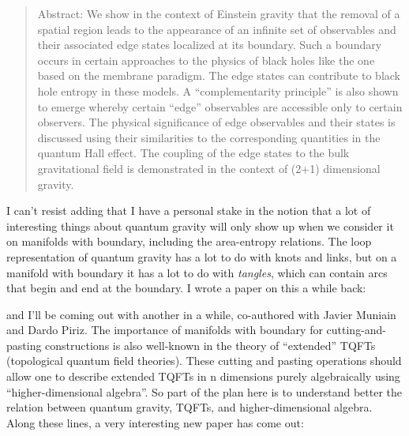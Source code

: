 \documentclass{article}
\def\tightlist{}
\renewcommand{\texttt}[1]{%
  \begingroup
  \ttfamily
  \begingroup\lccode`~=`/\lowercase{\endgroup\def~}{/\discretionary{}{}{}}%
  \begingroup\lccode`~=`[\lowercase{\endgroup\def~}{[\discretionary{}{}{}}%
  \begingroup\lccode`~=`.\lowercase{\endgroup\def~}{.\discretionary{}{}{}}%
  \catcode`/=\active\catcode`[=\active\catcode`.=\active
  \scantokens{#1\noexpand}%
  \endgroup
}
\begin{document}
\begin{quote}
Abstract: We show in the context of Einstein gravity that the removal of
a spatial region leads to the appearance of an infinite set of
observables and their associated edge states localized at its boundary.
Such a boundary occurs in certain approaches to the physics of black
holes like the one based on the membrane paradigm. The edge states can
contribute to black hole entropy in these models. A ``complementarity
principle'' is also shown to emerge whereby certain ``edge'' observables
are accessible only to certain observers. The physical significance of
edge observables and their states is discussed using their similarities
to the corresponding quantities in the quantum Hall effect. The coupling
of the edge states to the bulk gravitational field is demonstrated in
the context of (2+1) dimensional gravity.
\end{quote}

I can't resist adding that I have a personal stake in the notion that a
lot of interesting things about quantum gravity will only show up when
we consider it on manifolds with boundary, including the area-entropy
relations. The loop representation of quantum gravity has a lot to do
with knots and links, but on a manifold with boundary it has a lot to do
with \emph{tangles}, which can contain arcs that begin and end at the
boundary. I wrote a paper on this a while back:


and I'll be coming out with another in a while, co-authored with Javier
Muniain and Dardo Piriz. The importance of manifolds with boundary for
cutting-and-pasting constructions is also well-known in the theory of
``extended'' TQFTs (topological quantum field theories). These cutting
and pasting operations should allow one to describe extended TQFTs in n
dimensions purely algebraically using ``higher-dimensional algebra''. So
part of the plan here is to understand better the relation between
quantum gravity, TQFTs, and higher-dimensional algebra. Along these
lines, a very interesting new paper has come out:
\end{document}
